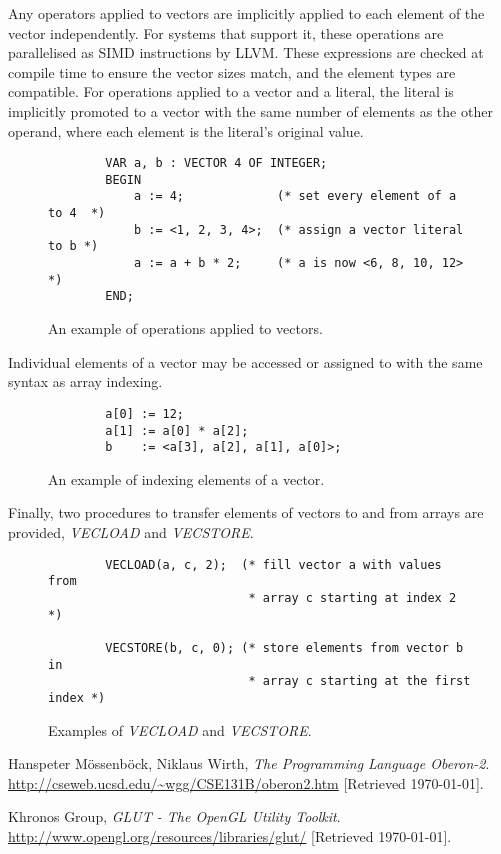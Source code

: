\documentclass[a4paper,11pt]{article}
\begin{document}
    \noindent
    Any operators applied to vectors are implicitly applied to each element of the vector independently. For systems that support it, these operations are parallelised as SIMD instructions by LLVM. These expressions are checked at compile time to ensure the vector sizes match, and the element types are compatible. For operations applied to a vector and a literal, the literal is implicitly promoted to a vector with the same number of elements as the other operand, where each element is the literal's original value.

    \begin{figure}[h]
    \begin{lstlisting}
        VAR a, b : VECTOR 4 OF INTEGER;
        BEGIN
            a := 4;             (* set every element of a to 4  *)
            b := <1, 2, 3, 4>;  (* assign a vector literal to b *)
            a := a + b * 2;     (* a is now <6, 8, 10, 12>      *)
        END;
    \end{lstlisting}
    \caption{An example of operations applied to vectors.}
    \end{figure}

    \noindent
    Individual elements of a vector may be accessed or assigned to with the same syntax as array indexing.

    \begin{figure}[!htbp]
    \begin{lstlisting}
        a[0] := 12;
        a[1] := a[0] * a[2];
        b    := <a[3], a[2], a[1], a[0]>;
    \end{lstlisting}
    \caption{An example of indexing elements of a vector.}
    \end{figure}

    \noindent
    Finally, two procedures to transfer elements of vectors to and from arrays are provided, \emph{VECLOAD} and \emph{VECSTORE}.

    \begin{figure}[!htbp]
    \begin{lstlisting}
        VECLOAD(a, c, 2);  (* fill vector a with values from
                            * array c starting at index 2    *)

        VECSTORE(b, c, 0); (* store elements from vector b in
                            * array c starting at the first index *)
    \end{lstlisting}
    \caption{Examples of \emph{VECLOAD} and \emph{VECSTORE}.}
    \end{figure}

    \newpage
    \begin{thebibliography}{9}
            Hanspeter M\"{o}ssenb\"{o}ck, Niklaus Wirth,
            \emph{The Programming Language Oberon-2}. \newline
            \url{http://cseweb.ucsd.edu/~wgg/CSE131B/oberon2.htm}
            [Retrieved \today].

            Khronos Group,
            \emph{GLUT - The OpenGL Utility Toolkit}. \newline
            \url{http://www.opengl.org/resources/libraries/glut/}
            [Retrieved \today].

    \end{thebibliography}
\end{document}
